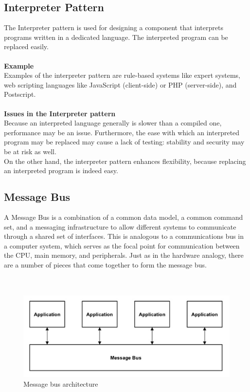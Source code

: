 \documentclass{article}
\begin{document}
\subsection{Interpreter Pattern}
The Interpreter pattern is used for designing a component that interprets programs written in a dedicated language. The interpreted program can be replaced easily.\\\\
\textbf{Example}
\\Examples of the interpreter pattern are rule-based systems like expert systems, web scripting languages like JavaScript (client-side) or PHP (server-side), and Postscript.\\\\
\textbf{Issues in the Interpreter pattern}
\\Because an interpreted language generally is slower than a compiled one, performance may be an issue. Furthermore, the ease with which an interpreted program may be replaced may cause a lack of testing: stability and security may be at risk as well.\\
On the other hand, the interpreter pattern enhances flexibility, because replacing an interpreted program is indeed easy.

\newpage




\subsection{Message Bus}
A Message Bus is a combination of a common data model, a common command set, and a messaging infrastructure to allow different systems to communicate through a shared set of interfaces. This is analogous to a communications bus in a computer system, which serves as the focal point for communication between the CPU, main memory, and peripherals. Just as in the hardware analogy, there are a number of pieces that come together to form the message bus.\\\\\\


\begin{figure}[h]
\centering
\includegraphics[scale=0.55]{mb.jpg}
\caption{Message bus architecture}
\label{fig_mb}
\end{figure}
\newpage
\end{document}
